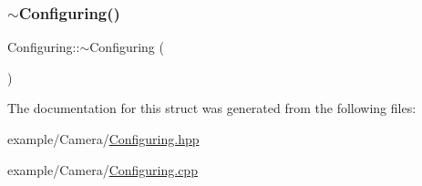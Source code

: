 \mbox{\label{struct_configuring_a80ac4ce0d8593f56e3dd58a469fc8149}} 
\subsubsection{\texorpdfstring{$\sim$\+Configuring()}{~Configuring()}}
{\footnotesize\ttfamily Configuring\+::$\sim$\+Configuring (\begin{DoxyParamCaption}{ }\end{DoxyParamCaption})}



The documentation for this struct was generated from the following files\+:\begin{DoxyCompactItemize}
\item 
example/\+Camera/\mbox{\hyperlink{_configuring_8hpp}{Configuring.\+hpp}}\item 
example/\+Camera/\mbox{\hyperlink{_configuring_8cpp}{Configuring.\+cpp}}\end{DoxyCompactItemize}
